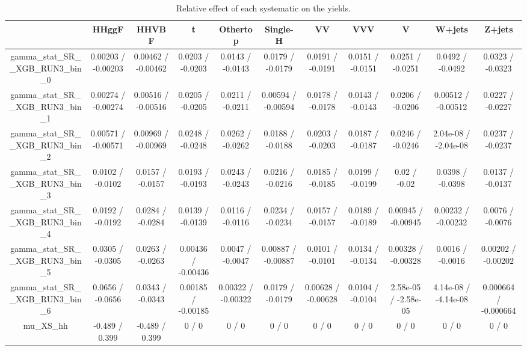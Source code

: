 \documentclass[10pt]{article}
\begin{document}
\begin{table}[htbp]
\begin{center}
\begin{tabular}{|c|c|c|c|c|c|c|c|c|c|c|}
\hline 
      & HHggF      & HHVBF      & t      & Othertop      & Single-H      & VV      & VVV      & V      & W+jets      & Z+jets \\ 
\hline 
  gamma_stat_SR__XGB_RUN3_bin_0 & 0.00203 / -0.00203 & 0.00462 / -0.00462 & 0.0203 / -0.0203 & 0.0143 / -0.0143 & 0.0179 / -0.0179 & 0.0191 / -0.0191 & 0.0151 / -0.0151 & 0.0251 / -0.0251 & 0.0492 / -0.0492 & 0.0323 / -0.0323 \\ 
  gamma_stat_SR__XGB_RUN3_bin_1 & 0.00274 / -0.00274 & 0.00516 / -0.00516 & 0.0205 / -0.0205 & 0.0211 / -0.0211 & 0.00594 / -0.00594 & 0.0178 / -0.0178 & 0.0143 / -0.0143 & 0.0206 / -0.0206 & 0.00512 / -0.00512 & 0.0227 / -0.0227 \\ 
  gamma_stat_SR__XGB_RUN3_bin_2 & 0.00571 / -0.00571 & 0.00969 / -0.00969 & 0.0248 / -0.0248 & 0.0262 / -0.0262 & 0.0188 / -0.0188 & 0.0203 / -0.0203 & 0.0187 / -0.0187 & 0.0246 / -0.0246 & 2.04e-08 / -2.04e-08 & 0.0237 / -0.0237 \\ 
  gamma_stat_SR__XGB_RUN3_bin_3 & 0.0102 / -0.0102 & 0.0157 / -0.0157 & 0.0193 / -0.0193 & 0.0243 / -0.0243 & 0.0216 / -0.0216 & 0.0185 / -0.0185 & 0.0199 / -0.0199 & 0.02 / -0.02 & 0.0398 / -0.0398 & 0.0137 / -0.0137 \\ 
  gamma_stat_SR__XGB_RUN3_bin_4 & 0.0192 / -0.0192 & 0.0284 / -0.0284 & 0.0139 / -0.0139 & 0.0116 / -0.0116 & 0.0234 / -0.0234 & 0.0157 / -0.0157 & 0.0189 / -0.0189 & 0.00945 / -0.00945 & 0.00232 / -0.00232 & 0.0076 / -0.0076 \\ 
  gamma_stat_SR__XGB_RUN3_bin_5 & 0.0305 / -0.0305 & 0.0263 / -0.0263 & 0.00436 / -0.00436 & 0.0047 / -0.0047 & 0.00887 / -0.00887 & 0.0101 / -0.0101 & 0.0134 / -0.0134 & 0.00328 / -0.00328 & 0.0016 / -0.0016 & 0.00202 / -0.00202 \\ 
  gamma_stat_SR__XGB_RUN3_bin_6 & 0.0656 / -0.0656 & 0.0343 / -0.0343 & 0.00185 / -0.00185 & 0.00322 / -0.00322 & 0.0179 / -0.0179 & 0.00628 / -0.00628 & 0.0104 / -0.0104 & 2.58e-05 / -2.58e-05 & 4.14e-08 / -4.14e-08 & 0.000664 / -0.000664 \\ 
  mu_XS_hh & -0.489 / 0.399 & -0.489 / 0.399 & 0 / 0 & 0 / 0 & 0 / 0 & 0 / 0 & 0 / 0 & 0 / 0 & 0 / 0 & 0 / 0 \\ 
\hline 
\end{tabular} 
\caption{Relative effect of each systematic on the yields.} 
\end{center} 
\end{table} 
\end{document}
